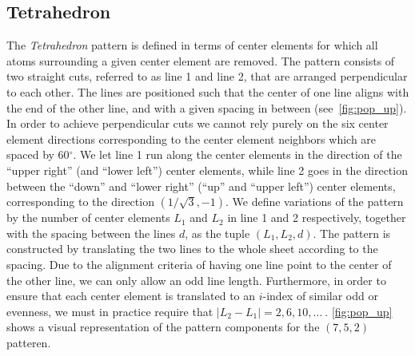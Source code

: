 \subsection{Tetrahedron}
The \textit{Tetrahedron} pattern is defined in terms of center elements for
which all atoms surrounding a given center element are removed. The pattern
consists of two straight cuts, referred to as line 1 and line 2, that are
arranged perpendicular to each other. The lines are positioned such that the
center of one line aligns with the end of the other line, and with a given spacing in
between (see~\cref{fig:pop_up}). In order to achieve
perpendicular cuts we cannot rely purely on the six center element directions
corresponding to the center element neighbors which are spaced by 60$^\circ$. We
let line 1 run along the center elements in the direction of the ``upper right''
(and ``lower left'') center elements, while line 2 goes in the direction between
the ``down'' and ``lower right'' (``up'' and ``upper left'') center elements,
corresponding to the direction $(1/\sqrt{3}, -1)$. We define variations of the
pattern by the number of center elements $L_1$ and $L_2$ in line 1 and 2
respectively, together with the spacing between the lines $d$, as the tuple
$(L_1, L_2, d)$. The pattern is constructed by translating the two lines to the
whole sheet according to the spacing. Due to the alignment criteria of having
one line point to the center of the other line, we can only allow an odd line
length. Furthermore, in order to ensure that each center element is translated
to an $i$-index of similar odd or evenness, we must in practice require that
$|L_2 - L_1| = 2, 6, 10, \ldots \ $. \cref{fig:pop_up} shows a visual
representation of the pattern components for the $(7, 5, 2)$ patteren. 


